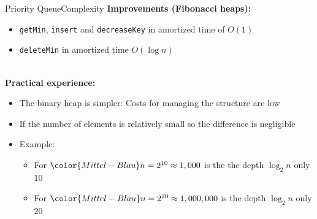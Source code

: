 \begin{frame}{Priority Queue}{Complexity}
  \textbf{Improvements (Fibonacci heaps):}
  \begin{itemize}
    \item<2->
      {\color{Mittel-Blau}\texttt{getMin}},
      {\color{Mittel-Blau}\texttt{insert}} and
      {\color{Mittel-Blau}\texttt{decreaseKey}}
      in amortized time of {\color{Mittel-Blau}$O(1)$}
    \item<3->
      {\color{Mittel-Blau}\texttt{deleteMin}}
      in amortized time {\color{Mittel-Blau}$O(\log n)$}
  \end{itemize}
  \hfill\\[0.5em]
  \textbf{Practical experience:}
  \begin{itemize}
    \item<5->
      The binary heap is simpler: Costs for managing the structure are low
    \item<6->
      If the number of elements is relatively small so the difference is
      negligible
    \item<7->
      Example:
    \begin{itemize}
      \item
        For ${\color{Mittel-Blau}n = 2^{10}} \approx 1,000$ is the the
        {\color{Mittel-Blau}depth}
        $\log_2 n$ only 10
      \item
        For ${\color{Mittel-Blau}n = 2^{20}} \approx 1,000,000$ is the
        {\color{Mittel-Blau}depth}
        $\log_2 n$ only 20
    \end{itemize}
  \end{itemize}
\end{frame}

